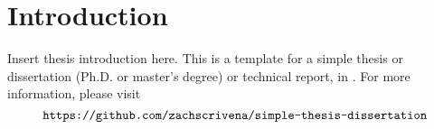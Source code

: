 \chapter{Introduction}

{\color{red}%
Insert thesis introduction here.
This is a template for a simple thesis or dissertation (Ph.D. or master's degree) or technical report, in {\XeLaTeX}.
For more information, please visit
\[
\verb|https://github.com/zachscrivena/simple-thesis-dissertation|
\]}
\lipsum[1-8]
